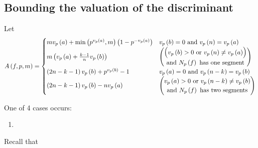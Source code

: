 \documentclass[../main.tex]{subfiles}
\begin{document}
\subsection{Bounding the valuation of the discriminant}
Let 
\[
  A\left( f, p, m \right) = \begin{cases}
    m v_p\left( a \right) + \min\left( p^{v_p\left( a \right)}, m \right) \left( 1 - p^{-v_p\left( a \right)} \right) 
    & 
    v_p\left( b \right) = 0 \text{ and } v_p\left( n \right) = v_p\left( a \right) 
    \\ 
    m \left( v_p\left( a \right) + \frac{k-1}{n}v_p\left( b \right) \right) 
    &  
    \begin{pmatrix}
      \begin{pmatrix}
        v_p\left( b \right) > 0 \text{ or } v_p\left( n \right) \neq v_p\left( a \right)
      \end{pmatrix}
      \\
      \text{ and } N_p\left( f \right) \text{ has one segment } 
    \end{pmatrix} \\
    \left( 2n - k - 1 \right)v_p\left( b \right) + p^{v_p\left( b \right)} - 1 
    & 
    v_p\left( a \right) = 0 \text{ and } v_p\left( n - k \right) = v_p\left( b \right)
    \\
    \left( 2n - k - 1 \right)v_p\left( b \right) - n v_p\left( a \right) 
    & 
    \begin{pmatrix}
      v_p\left( a \right) > 0  \text{ or } v_p\left( n - k \right) \neq v_p\left( b \right)
      \\
      \text{ and } N_p\left( f \right) \text{ has two segments }
    \end{pmatrix}
  \end{cases}
\]
\begin{lemma}
  One of 4 cases occurs:
  \begin{enumerate}
    \item 
  \end{enumerate}
\end{lemma}
Recall that 
    
\begin{lemma}
  
\end{lemma}
\end{document}
